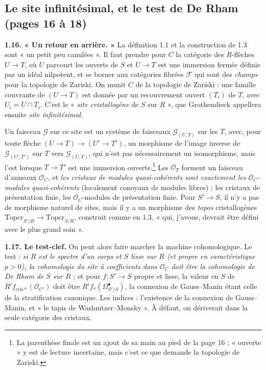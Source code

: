 \documentclass[11pt,a4paper]{article}
\begin{document}
\subsection*{Le site infinitésimal, et le test de De Rham (pages 16 à 18)}

\textbf{1.16. « Un retour en arrière. »} La définition 1.1 et la construction
de 1.3 sont « un petit peu canulées ». Il faut prendre pour $C$ la catégorie
des $R$-flèches $U \to T$, où $U$ parcourt les ouverts de $S$ et $U \to T$ est
une immersion fermée définie par un idéal nilpotent, et se borner aux
catégories fibrées $\mathcal{F}$ qui sont des \emph{champs} pour la topologie
de Zariski. On munit $C$ de la topologie de Zariski : une famille couvrante de
$(U \to T)$ est donnée par un recouvrement ouvert $(T_i)$ de $T$, avec
$U_i = U \cap T_i$. C'est le « \emph{site cristallogène} de $S$ sur $R$ », que
Grothendieck appellera ensuite \emph{site infinitésimal}.

Un faisceau $\mathcal{G}$ sur ce site est un système de faisceaux
$\mathcal{G}_{(U,T)}$ sur les $T$, avec, pour toute flèche
$(U \to T) \to (U' \to T')$, un morphisme de l'image inverse de
$\mathcal{G}_{(U',T')}$ sur $T$ vers $\mathcal{G}_{(U,T)}$, qui n'est pas
nécessairement un isomorphisme, mais l'est lorsque $T \to T'$ est une immersion
ouverte.\footnote{La parenthèse finale est un ajout de sa main au pied de la
page 16 ; « ouverte » y est de lecture incertaine, mais c'est ce que demande
la topologie de Zariski.} Les $\mathcal{O}_T$ forment un faisceau d'anneaux
$\mathcal{O}_C$, et \emph{les cristaux de modules quasi-cohérents sont
exactement les $\mathcal{O}_C$-modules quasi-cohérents} (localement conoyaux
de modules libres) ; les cristaux de présentation finie, les
$\mathcal{O}_C$-modules de présentation finie. Pour $S' \to S$, il n'y a pas de
morphisme naturel de sites, mais il y a un morphisme des \emph{topos}
cristallogènes $\mathrm{Topcr}_{S'/R} \to \mathrm{Topcr}_{S/R}$, construit
comme en 1.3, « qui, j'avoue, devrait être défini avec le plus grand soin ».

\textbf{1.17. Le test-clef.} On peut alors faire marcher la machine
cohomologique. Le test : \emph{si $R$ est le spectre d'un corps et $S$ lisse
sur $R$ (et propre en caractéristique $p > 0$), la cohomologie du site à
coefficients dans $\mathcal{O}_C$ doit être la cohomologie de De Rham de $S$
sur $R$} ; et pour $f : S' \to S$ propre et lisse, la valeur en $S$ de
$R^if_{\mathrm{cris}*}(\mathcal{O}_{C'})$ doit être $R^if_*(\Omega^\bullet_{S'/S})$,
la connexion de Gauss--Manin étant celle de la stratification canonique. Les
indices : l'existence de la connexion de Gauss--Manin, et « le tapis de
Washnitzer--Monsky ». À défaut, on dériverait dans la seule catégorie des
cristaux.
\end{document}
